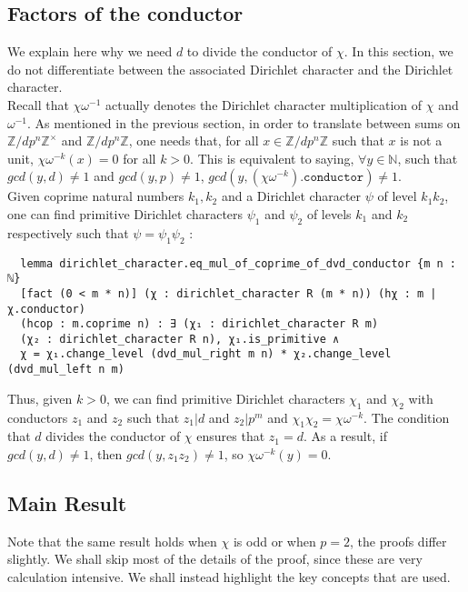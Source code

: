 \documentclass[11pt]{article}
\begin{document}
\subsection{Factors of the conductor}
We explain here why we need $d$ to divide the conductor of $\chi$. In this section, we do not differentiate between the associated Dirichlet 
character and the Dirichlet character. \\

Recall that $\chi \omega^{-1}$ actually denotes the Dirichlet 
character multiplication of $\chi$ and $\omega^{-1}$. As mentioned in the previous section, in order to translate between sums on 
$\mathbb{Z}/ d p^n \mathbb{Z} ^{\times}$ and $\mathbb{Z}/ d p^n \mathbb{Z}$, one needs that, for all $x \in \mathbb{Z}/ d p^n \mathbb{Z}$ 
such that $x$ is not a unit, $\chi \omega^{-k} (x) = 0$ for all $k > 0$. This is equivalent to saying, $\forall y \in \mathbb{N}$, such that 
$gcd (y, d) \ne 1$ and $gcd (y, p) \ne 1$, $gcd (y, (\chi \omega^{-k})\texttt{.conductor}) \ne 1$. \\

Given coprime natural numbers $k_1, k_2$ and a Dirichlet character $\psi$ of level $k_1 k_2$, one can find primitive Dirichlet characters 
$\psi_1$ and $\psi_2$ of levels $k_1$ and $k_2$ respectively such that $\psi = \psi_1 \psi_2$ : 
\begin{lstlisting}
  lemma dirichlet_character.eq_mul_of_coprime_of_dvd_conductor {m n : ℕ} 
  [fact (0 < m * n)] (χ : dirichlet_character R (m * n)) (hχ : m | χ.conductor) 
  (hcop : m.coprime n) : ∃ (χ₁ : dirichlet_character R m) 
  (χ₂ : dirichlet_character R n), χ₁.is_primitive ∧ 
  χ = χ₁.change_level (dvd_mul_right m n) * χ₂.change_level (dvd_mul_left n m) 
\end{lstlisting}

Thus, given $k > 0$, we can find primitive Dirichlet characters $\chi_1$ and $\chi_2$ with conductors $z_1$ and $z_2$ such that 
$z_1 | d$ and $z_2 | p^m$ and $\chi_1 \chi_2 = \chi \omega^{-k}$. The condition that $d$ divides the conductor of $\chi$ ensures 
that $z_1 = d$. As a result, if $gcd (y, d) \ne 1$, then $gcd (y, z_1 z_2) \ne 1$, so $\chi \omega^{-k} (y) = 0$.

\subsection{Main Result}
Note that the same result holds when $\chi$ is odd or when $p = 2$, the proofs differ slightly. We shall 
skip most of the details of the proof, since these are very calculation intensive. We shall instead highlight the key concepts 
that are used. \\
\end{document}
